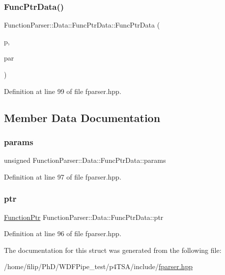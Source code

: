\subsubsection{\texorpdfstring{Func\+Ptr\+Data()}{FuncPtrData()}}
{\footnotesize\ttfamily Function\+Parser\+::\+Data\+::\+Func\+Ptr\+Data\+::\+Func\+Ptr\+Data (\begin{DoxyParamCaption}\item[{\hyperlink{class_function_parser_acca53651fb8f1c7a44e3d2cac7e62455}{Function\+Ptr}}]{p,  }\item[{unsigned}]{par }\end{DoxyParamCaption})\hspace{0.3cm}{\ttfamily [inline]}}



Definition at line 99 of file fparser.\+hpp.



\subsection{Member Data Documentation}
\mbox{\label{struct_function_parser_1_1_data_1_1_func_ptr_data_aa9389ca2450fe7dbc7618c624280da92}} 
\subsubsection{\texorpdfstring{params}{params}}
{\footnotesize\ttfamily unsigned Function\+Parser\+::\+Data\+::\+Func\+Ptr\+Data\+::params}



Definition at line 97 of file fparser.\+hpp.

\mbox{\label{struct_function_parser_1_1_data_1_1_func_ptr_data_a77521adad1c4cb850c9e439c72986a0c}} 
\subsubsection{\texorpdfstring{ptr}{ptr}}
{\footnotesize\ttfamily \hyperlink{class_function_parser_acca53651fb8f1c7a44e3d2cac7e62455}{Function\+Ptr} Function\+Parser\+::\+Data\+::\+Func\+Ptr\+Data\+::ptr}



Definition at line 96 of file fparser.\+hpp.



The documentation for this struct was generated from the following file\+:\begin{DoxyCompactItemize}
\item 
/home/filip/\+Ph\+D/\+W\+D\+F\+Pipe\+\_\+test/p4\+T\+S\+A/include/\hyperlink{fparser_8hpp}{fparser.\+hpp}\end{DoxyCompactItemize}
